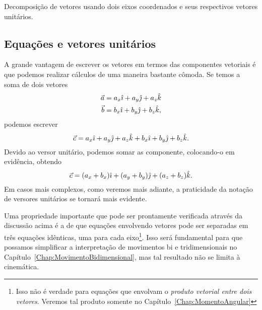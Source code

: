 \begin{marginfigure}
\centering
{}
\caption{Decomposição de vetores usando dois eixos coordenados e seus respectivos vetores unitários.\label{Fig:sis_ref_orto_vers}}
\end{marginfigure}

\subsection{Equações e vetores unitários}

A grande vantagem de escrever os vetores em termos das componentes vetoriais é que podemos realizar cálculos de uma maneira bastante cômoda. Se temos a soma de dois vetores 
\begin{align}
  \vec{a} &= a_x \hat{\imath} + a_y \hat{\jmath} + a_z \hat{k} \\
  \vec{b} &= b_x \hat{\imath} + b_y \hat{\jmath} + b_z \hat{k},
\end{align}
%
podemos escrever
\begin{equation}
  \vec{c} = a_x \hat{\imath} + a_y \hat{\jmath} + a_z \hat{k} + b_x \hat{\imath} + b_y \hat{\jmath} + b_z \hat{k}.
\end{equation}
%
Devido ao versor unitário, podemos somar as componente, colocando-o em evidência, obtendo
\begin{equation}
  \vec{c} = (a_x + b_x) \hat{\imath} + (a_y + b_y) \hat{\jmath} + (a_z + b_z)\hat{k}.
\end{equation}
%
Em casos mais complexos, como veremos mais adiante, a praticidade da notação de versores unitários se tornará mais evidente.

Uma propriedade importante que pode ser prontamente verificada através da discussão acima é a de que equações envolvendo vetores pode ser separadas em três equações idênticas, uma para cada eixo\footnote{Isso não é verdade para equações que envolvam o \emph{produto vetorial entre dois vetores}. Veremos tal produto somente no Capítulo~\ref{Chap:MomentoAngular}}. Isso será fundamental para que possamos simplificar a interpretação de movimentos bi e tridimensionais no Capítulo~\ref{Chap:MovimentoBidimensional}, mas tal resultado não se limita à cinemática.
